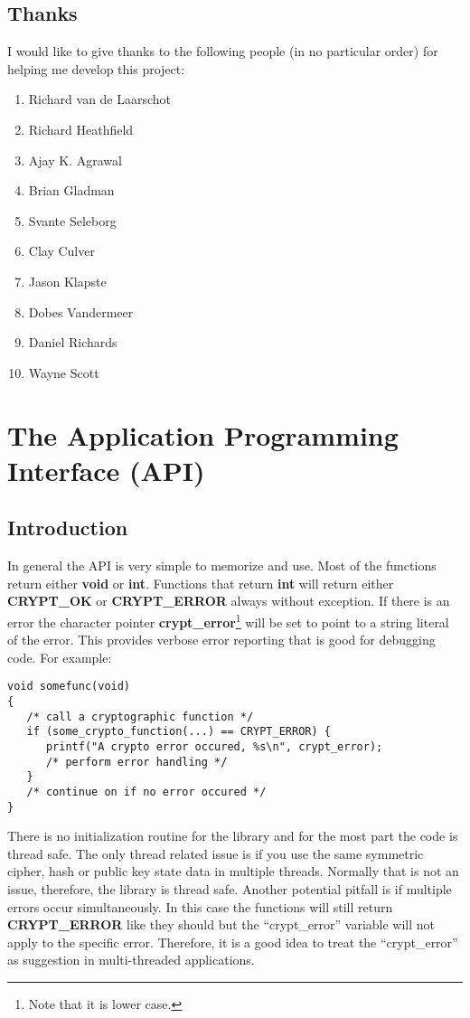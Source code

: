 \documentclass{book}
\begin{document}
\section{Thanks}
I would like to give thanks to the following people (in no particular order) for helping me develop this project:
\begin{enumerate}
   \item Richard van de Laarschot
   \item Richard Heathfield
   \item Ajay K. Agrawal
   \item Brian Gladman
   \item Svante Seleborg
   \item Clay Culver
   \item Jason Klapste
   \item Dobes Vandermeer
   \item Daniel Richards
   \item Wayne Scott
\end{enumerate}

\chapter{The Application Programming Interface (API)}
\section{Introduction}
 

In general the API is very simple to memorize and use.  Most of the functions return either {\bf void} or {\bf int}.  Functions
that return {\bf int} will return either {\bf CRYPT\_OK} or {\bf CRYPT\_ERROR} always without exception.  If there is an
error the character pointer {\bf crypt\_error}\footnote{Note that it is lower case.} will be set to point to a string
literal of the error.  This provides verbose error reporting that is good for debugging code.  For example:
\begin{verbatim}
void somefunc(void)
{
   /* call a cryptographic function */
   if (some_crypto_function(...) == CRYPT_ERROR) {
      printf("A crypto error occured, %s\n", crypt_error);
      /* perform error handling */
   }
   /* continue on if no error occured */
}
\end{verbatim}

There is no initialization routine for the library and for the most part the code is thread safe.  The only thread
related issue is if you use the same symmetric cipher, hash or public key state data in multiple threads.  Normally
that is not an issue, therefore, the library is thread safe.  Another potential pitfall is if multiple errors occur
simultaneously.  In this case the functions will still return {\bf CRYPT\_ERROR} like they should but the ``crypt\_error''
variable will not apply to the specific error.  Therefore, it is a good idea to treat the ``crypt\_error'' as suggestion
in multi-threaded applications.
\end{document}

